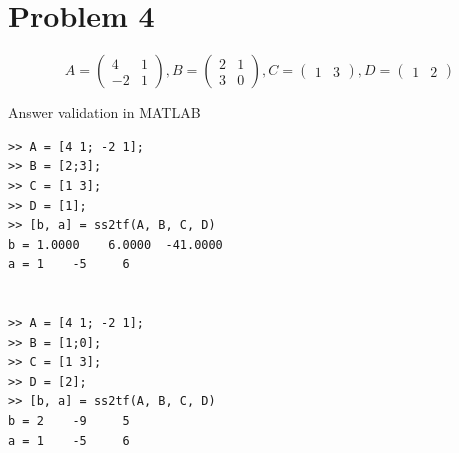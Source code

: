 \documentclass[a4paper,11pt]{article}
\makeatletter
\newcommand{\problemquestion}[1]{\gdef\@problemquestion{#1}}%
\newcommand{\problemsolution}[1]{\gdef\@problemsolution{#1}}%
\theoremstyle{mytheor}
\makeatother
\begin{document}
\section*{Problem 4}
$$A = \begin{pmatrix}
4 & 1\\ 
-2 & 1 
\end{pmatrix}, B = \begin{pmatrix}
2 & 1\\ 
3 & 0
\end{pmatrix}, C = \begin{pmatrix}
1 & 3
\end{pmatrix}, D = \begin{pmatrix}
1 & 2
\end{pmatrix}$$
\begin{problem}
  \problemquestion{Find transfer functions of the system.}
  \problemsolution{
      Using formula for converting SS to TF:
    $$Y(s) = \{C(sI - A)^{-1}B + D\}U(s)$$
    $$(sI - A) = \begin{pmatrix}
s - 4 & -1 \\
2 & s - 1
\end{pmatrix}$$
    $$(sI - A)^{-1} = \frac{1}{s^2-5s+6}\begin{pmatrix}
s - 1 & 1 \\
-2 & s - 4
\end{pmatrix}$$
$$C(sI - A)^{-1} = \frac{1}{s^2-5s+6}\begin{pmatrix}
s - 7 & 3s - 11 \\
\end{pmatrix}$$
$$C(sI - A)^{-1}B = \begin{pmatrix}
\frac{11s - 47}{s^2-5s+6} & \frac{s-7}{s^2-5s+6}\\
\end{pmatrix}$$
$$C(sI - A)^{-1}B + D = \begin{pmatrix}
\frac{s^2 + 6s - 41}{s^2-5s+6} & \frac{2s^2-9s+5} {s^2-5s+6} \\
\end{pmatrix}$$
$$Answer:
TF_1: \frac{s^2 + 6s - 41}{s^2-5s+6}, \hspace{0.5cm}
TF_2:\frac{2s^2-9s+5} {s^2-5s+6}$$
  }
\end{problem}


Answer validation in MATLAB
\begin{lstlisting}
>> A = [4 1; -2 1];
>> B = [2;3];
>> C = [1 3];
>> D = [1];
>> [b, a] = ss2tf(A, B, C, D)
b = 1.0000    6.0000  -41.0000
a = 1    -5     6


>> A = [4 1; -2 1];
>> B = [1;0];
>> C = [1 3];
>> D = [2];
>> [b, a] = ss2tf(A, B, C, D)
b = 2    -9     5
a = 1    -5     6
\end{lstlisting}
\end{document}
